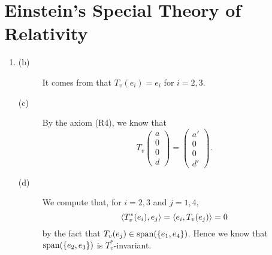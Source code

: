 \section{Einstein's Special Theory of Relativity}
\begin{enumerate}
\item \begin{description}
\item[(b)] It comes from that $T_v(e_i)=e_i$ for $i=2,3$.
\item[(c)] By the axiom (R4), we know that 
\[T_v\begin{pmatrix}a\\0\\0\\d\end{pmatrix}=\begin{pmatrix}a'\\0\\0\\d'\end{pmatrix}.\]
\item[(d)] We compute that, for $i=2,3$ and $j=1,4$,  
\[\lag T_v^*(e_i),e_j\rag =\lag e_i,T_v(e_j)\rag =0\]
by the fact that $T_v(e_j)\in \sp(\{e_1,e_4\})$. Hence we know that $\sp(\{e_2,e_3\})$ is $T_v^*$-invariant. 


\end{description}
\end{enumerate}
